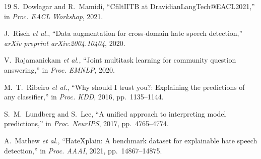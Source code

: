 \documentclass[conference]{IEEEtran}
\begin{document}
\begin{thebibliography}{19}
S.~Dowlagar and R.~Mamidi, ``CfiltIITB at DravidianLangTech@EACL2021,'' in \textit{Proc. EACL Workshop}, 2021.

J.~Risch \textit{et al.}, ``Data augmentation for cross-domain hate speech detection,'' \textit{arXiv preprint arXiv:2004.10404}, 2020.

V.~Rajamanickam \textit{et al.}, ``Joint multitask learning for community question answering,'' in \textit{Proc. EMNLP}, 2020.

M.~T.~Ribeiro \textit{et al.}, ``Why should I trust you?: Explaining the predictions of any classifier,'' in \textit{Proc. KDD}, 2016, pp.~1135--1144.

S.~M.~Lundberg and S.~Lee, ``A unified approach to interpreting model predictions,'' in \textit{Proc. NeurIPS}, 2017, pp.~4765--4774.

A.~Mathew \textit{et al.}, ``HateXplain: A benchmark dataset for explainable hate speech detection,'' in \textit{Proc. AAAI}, 2021, pp.~14867--14875.

\end{thebibliography}
\end{document}
